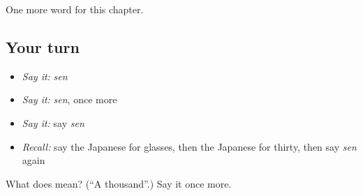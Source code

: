 \begin{grammarlens}[title={What you've built}]
One more word for this chapter.
\end{grammarlens}

\subsection*{Your turn}
\begin{itemize}
\raggedright
  \item \emph{Say it:} \emph{sen}
  \item \emph{Say it:} \emph{sen}, once more
  \item \emph{Say it:} say \emph{sen}
  \item \emph{Recall:} say the Japanese for glasses, then the Japanese for thirty, then say \emph{sen} again
\end{itemize}

\begin{tcolorbox}[breakable,colback=teal!4,colframe=teal!35!black,title={Before you move on}]
What does  mean? (\textquotedblleft{}A thousand\textquotedblright{}.) Say it once more.
\end{tcolorbox}
